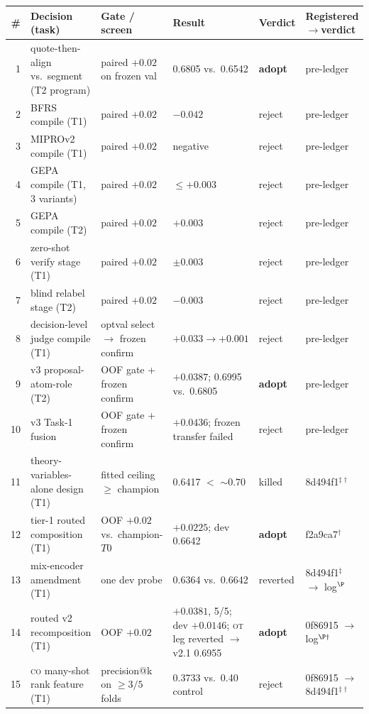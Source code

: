 \documentclass[11pt]{article}
\newcommand{\lab}[1]{\textsc{#1}}
\newcommand{\co}{\lab{co}}
\newcommand{\ot}{\lab{ot}}
\begin{document}
\begin{table}[t]
\centering\tiny
\setlength{\tabcolsep}{2.4pt}
\begin{tabular}{rlllll}
\toprule
\# & Decision (task) & Gate / screen & Result & Verdict & Registered$\rightarrow$verdict \\
\midrule
1 & quote-then-align vs.\ segment (T2 program) & paired $+0.02$ on frozen val & 0.6805 vs.\ 0.6542 & \textbf{adopt} & pre-ledger \\
2 & BFRS compile (T1) & paired $+0.02$ & $-0.042$ & reject & pre-ledger \\
3 & MIPROv2 compile (T1) & paired $+0.02$ & negative & reject & pre-ledger \\
4 & GEPA compile (T1, 3 variants) & paired $+0.02$ & $\leq +0.003$ & reject & pre-ledger \\
5 & GEPA compile (T2) & paired $+0.02$ & $+0.003$ & reject & pre-ledger \\
6 & zero-shot verify stage (T1) & paired $+0.02$ & $\pm 0.003$ & reject & pre-ledger \\
7 & blind relabel stage (T2) & paired $+0.02$ & $-0.003$ & reject & pre-ledger \\
8 & decision-level judge compile (T1) & optval select $\rightarrow$ frozen confirm & $+0.033 \rightarrow +0.001$ & reject & pre-ledger \\
9 & v3 proposal-atom-role (T2) & OOF gate + frozen confirm & $+0.0387$; 0.6995 vs.\ 0.6805 & \textbf{adopt} & pre-ledger \\
10 & v3 Task-1 fusion & OOF gate + frozen confirm & $+0.0436$; frozen transfer failed & reject & pre-ledger \\
11 & theory-variables-alone design (T1) & fitted ceiling $\geq$ champion & 0.6417 $<$ ${\sim}0.70$ & killed & 8d494f1$^{\ddagger\dagger}$ \\
12 & tier-1 routed composition (T1) & OOF $+0.02$ vs.\ champion-$T0$ & $+0.0225$; dev 0.6642 & \textbf{adopt} & f2a9ca7$^{\dagger}$ \\
13 & mix-encoder amendment (T1) & one dev probe & 0.6364 vs.\ 0.6642 & reverted & 8d494f1$^{\ddagger}$ $\rightarrow$ log$^{\P}$ \\
14 & routed v2 recomposition (T1) & OOF $+0.02$ & $+0.0381$, 5/5; dev $+0.0146$; \ot{} leg reverted $\rightarrow$ v2.1 0.6955 & \textbf{adopt} & 0f86915 $\rightarrow$ log$^{\P\dagger}$ \\
15 & \co{} many-shot rank feature (T1) & precision@k on $\geq 3/5$ folds & 0.3733 vs.\ 0.40 control & reject & 0f86915 $\rightarrow$ 8d494f1$^{\ddagger\dagger}$ \\

\end{tabular}
\end{table}
\end{document}
